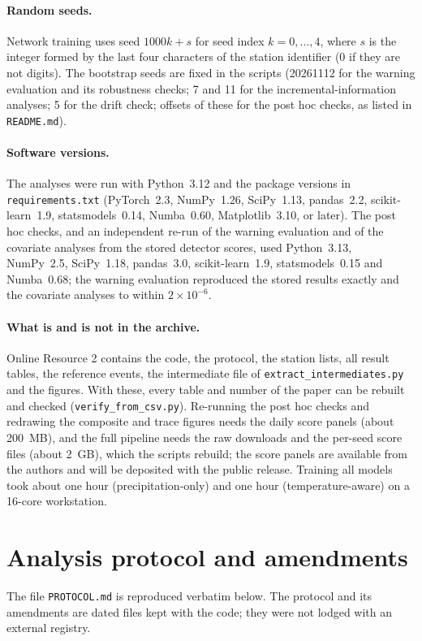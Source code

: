 \documentclass[pdflatex,sn-mathphys-ay]{sn-jnl}
\begin{document}
\paragraph{Random seeds.} Network training uses seed $1000k+s$ for seed index $k=0,\dots,4$, where $s$ is
the integer formed by the last four characters of the station identifier (0 if they are not digits). The
bootstrap seeds are fixed in the scripts (20261112 for the warning evaluation and its robustness checks;
7 and 11 for the incremental-information analyses; 5 for the drift check; offsets of these for the post
hoc checks, as listed in \texttt{README.md}).

\paragraph{Software versions.} The analyses were run with Python~3.12 and the package versions in
\texttt{requirements.txt} (PyTorch~2.3, NumPy~1.26, SciPy~1.13, pandas~2.2, scikit-learn~1.9,
statsmodels~0.14, Numba~0.60, Matplotlib~3.10, or later). The post hoc checks, and an independent re-run of the warning evaluation and
of the covariate analyses from the stored detector scores, used Python~3.13, NumPy~2.5, SciPy~1.18,
pandas~3.0, scikit-learn~1.9, statsmodels~0.15 and Numba~0.68; the warning evaluation reproduced the stored
results exactly and the covariate analyses to within $2\times10^{-6}$.

\paragraph{What is and is not in the archive.} Online Resource 2 contains the code, the protocol, the
station lists, all result tables, the reference events, the intermediate file of
\texttt{extract\_intermediates.py} and the figures. With these, every table and number of the paper can be
rebuilt and checked (\texttt{verify\_from\_csv.py}). Re-running the post hoc checks and redrawing the
composite and trace figures needs the daily score panels (about 200~MB), and the full pipeline needs the
raw downloads and the per-seed score files (about 2~GB), which the scripts rebuild; the score panels are
available from the authors and will be deposited with the public release. Training all models took about
one hour (precipitation-only) and one hour (temperature-aware) on a 16-core workstation.

\section{Analysis protocol and amendments}\label{sec:protocol}
The file \texttt{PROTOCOL.md} is reproduced verbatim below. The protocol and its amendments are dated
files kept with the code; they were not lodged with an external registry.


\end{document}
